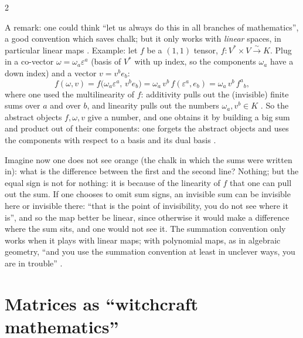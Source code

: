 \begin{paracol}{2}
\begin{remark}\label{rem:te-linear-only}
A remark: one could think ``let us always do this in all branches of mathematics'', a good convention which saves chalk; but it only works with \emph{linear} spaces, in particular linear maps .
Example: let $f$ be a $(1,1)$ tensor, $f\colon V^*\times V\xrightarrow{\sim}K$. Plug in a co-vector $\omega=\omega_a\varepsilon^a$ (basis of $V^*$ with up index, so the components $\omega_a$ have a down index) and a vector $v=v^be_b$:
\[
  f(\omega,v)=f\bigl(\omega_a\varepsilon^a,\,v^be_b\bigr)=\omega_a\,v^b\,f(\varepsilon^a,e_b)=\omega_a\,v^b\,f^a{}_b,
\]
where one used the multilinearity of $f$: additivity pulls out the (invisible) finite sums over $a$ and over $b$, and linearity pulls out the numbers $\omega_a,v^b\in K$ .
So the abstract objects $f,\omega,v$ give a number, and one obtains it by building a big sum and product out of their components: one forgets the abstract objects and uses the components with respect to a basis and its dual basis .
\end{remark}
Imagine now one does not see orange (the chalk in which the sums were written in): what is the difference between the first and the second line? Nothing; but the equal sign is not for nothing: it is because of the linearity of $f$ that one can pull out the sum. If one chooses to omit sum signs, an invisible sum can be invisible here or invisible there: ``that is the point
of invisibility, you do not see where it is'', and so the map better be linear, since otherwise it would make a difference where the sum sits, and one would not see it. The summation convention only works when it plays with linear maps; with polynomial maps, as in algebraic geometry, ``and you use the summation convention at least in unclever ways, you are in trouble''
.

\section{Matrices as ``witchcraft mathematics''}\label{sec:te-matrices}


\end{paracol}
